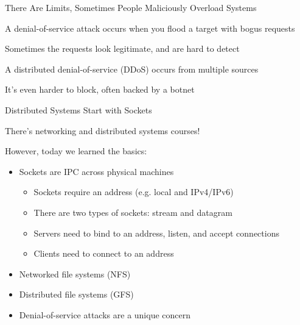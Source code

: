   \begin{frame}{There Are Limits, Sometimes People Maliciously Overload Systems}

    A denial-of-service attack occurs when you flood a target with bogus
    requests

    \hspace{2em} Sometimes the requests look legitimate, and are hard to detect

    \vspace{2em}

    A distributed denial-of-service (DDoS) occurs from multiple sources

    \hspace{2em} It's even harder to block, often backed by a botnet
  \end{frame}

  \begin{frame}{Distributed Systems Start with Sockets}

    There's networking and distributed systems courses!

    \vspace{2em}

    However, today we learned the basics:

    \begin{itemize}
      \item Sockets are IPC across physical machines
        \begin{itemize}
          \item Sockets require an address (e.g. local and IPv4/IPv6)
          \item There are two types of sockets: stream and datagram
          \item Servers need to bind to an address, listen, and accept connections
          \item Clients need to connect to an address
        \end{itemize}
      \item Networked file systems (NFS)
      \item Distributed file systems (GFS)
      \item Denial-of-service attacks are a unique concern
    \end{itemize}
  \end{frame}

